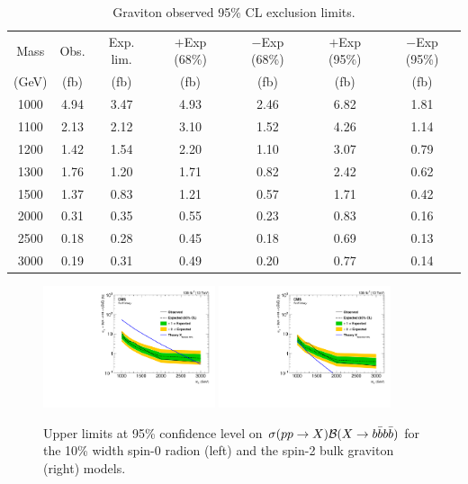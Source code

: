 	\begin{table}[h]
	\begin{center}
	\caption{Graviton observed 95\% CL exclusion limits. }
	\label{tab:ExpLimBG}
	\begin{tabular}{c c c c c c c } 
	 \hline
	 Mass& Obs. & Exp. lim.& $+$Exp (68\%)& $-$Exp (68\%)& $+$Exp (95\%)& $-$Exp (95\%)\\
	 (GeV) & (fb) & (fb) & (fb) & (fb)& (fb)& (fb) \\
	\hline
	 1000 & 4.94 & 3.47 & 4.93 & 2.46 & 6.82 & 1.81 \\
	 1100 & 2.13 & 2.12 & 3.10 & 1.52 & 4.26 & 1.14 \\
	 1200 & 1.42 & 1.54 & 2.20 & 1.10 & 3.07 & 0.79 \\
	 1300 & 1.76 & 1.20 & 1.71 & 0.82 & 2.42 & 0.62 \\
	 1500 & 1.37 & 0.83 & 1.21 & 0.57 & 1.71 & 0.42 \\
	 2000 & 0.31 & 0.35 & 0.55 & 0.23 & 0.83 & 0.16 \\
	 2500 & 0.18 & 0.28 & 0.45 & 0.18 & 0.69 & 0.13 \\
	 3000 & 0.19 & 0.31 & 0.49 & 0.20 & 0.77 & 0.14 \\
	 \hline
	\end{tabular}
	\end{center}
\end{table}
\clearpage

\begin{figure}[!htb]
	\centering
	\includegraphics[width=0.45\textwidth]{Figures/limits_combine_137fb_dak8MDHbb_signalsAll_RadNarWIDE_2x2.pdf}
        \includegraphics[width=0.45\textwidth]{Figures/limits_combine_137fb_dak8MDHbb_signalsAll_GravNarWIDE_2x2.pdf}
        \caption{Upper limits at 95\% confidence level on
        $\sigma(pp\to X) \mathcal{B}(X\to b \bar{b}b \bar{b})$
        for the 10\% width spin-0 radion (left) and
        the spin-2 bulk graviton (right) models.}
	\label{fig:RadionLimitFULLWide}
 	\label{fig:GravitonLimitFULLWide}
\end{figure}

